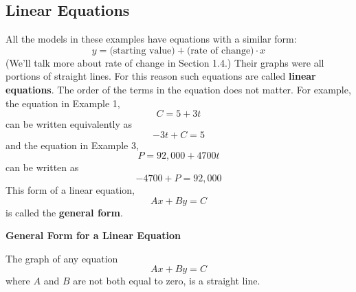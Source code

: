 \documentclass[10pt,]{book}
\newcommand{\terminology}[1]{\textbf{#1}}
\theoremstyle{plain}
\theoremstyle{definition}
\theoremstyle{definition}
\theoremstyle{definition}
\theoremstyle{definition}
\numberwithin{equation}{section}
\begin{document}
\subsection[Linear Equations]{Linear Equations}\label{subsection-3}
All the models in these examples have equations with a similar form:  \begin{equation*}y=\text{(starting value)}+\text{(rate of change)}\cdot x\end{equation*}
(We'll talk more about rate of change in Section 1.4.)  Their graphs were all portions of straight lines.  For this reason such equations are called  \terminology{linear equations}.  The order of the terms in the equation does not matter.  For example, the equation in Example 1, \begin{equation*}C=5+3t\end{equation*} can be written equivalently as \begin{equation*}-3t+C=5\end{equation*} and the equation in Example 3, \begin{equation*}P=92,000+4700t\end{equation*} can be written as \begin{equation*}-4700+P=92,000\end{equation*} 
This form of a linear equation, \begin{equation*}Ax+By=C\end{equation*} is called the \terminology{general form}.%
\begin{mdframed}[style=assemblage]%
\noindent\textbf{\large General Form for a Linear Equation}\label{assemblage-1}\par\medskip
The graph of any equation \begin{equation*}Ax+By=C\end{equation*} where \(A\) and \(B\) are not both equal to zero, is a straight line.%
\end{mdframed}
\end{document}
